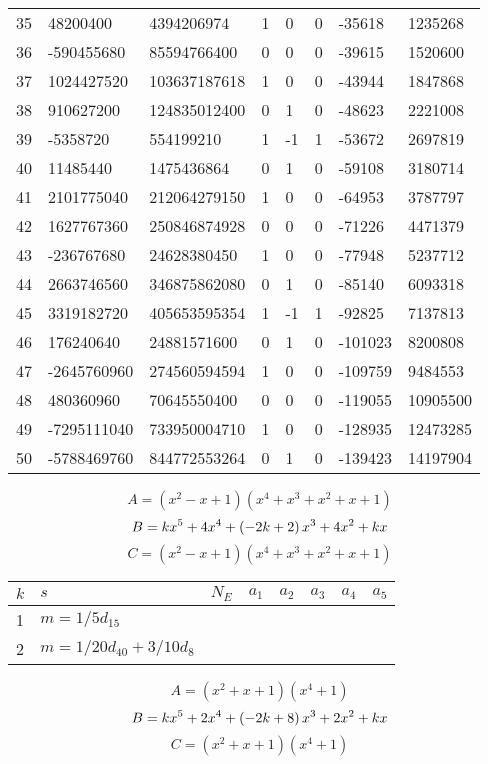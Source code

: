 \documentclass{amsart}
\begin{document}
\begin{longtable}{|l|l|l|lllll|}
35&48200400&4394206974&1&0&0&-35618&1235268\\
36&-590455680&85594766400&0&0&0&-39615&1520600\\
37&1024427520&103637187618&1&0&0&-43944&1847868\\
38&910627200&124835012400&0&1&0&-48623&2221008\\
39&-5358720&554199210&1&-1&1&-53672&2697819\\
40&11485440&1475436864&0&1&0&-59108&3180714\\
41&2101775040&212064279150&1&0&0&-64953&3787797\\
42&1627767360&250846874928&0&0&0&-71226&4471379\\
43&-236767680&24628380450&1&0&0&-77948&5237712\\
44&2663746560&346875862080&0&1&0&-85140&6093318\\
45&3319182720&405653595354&1&-1&1&-92825&7137813\\
46&176240640&24881571600&0&1&0&-101023&8200808\\
47&-2645760960&274560594594&1&0&0&-109759&9484553\\
48&480360960&70645550400&0&0&0&-119055&10905500\\
49&-7295111040&733950004710&1&0&0&-128935&12473285\\
50&-5788469760&844772553264&0&1&0&-139423&14197904\\
\hline
\end{longtable}
$$A=(x^2
 - x
 + 1)(x^4
 + x^3
 + x^2
 + x
 + 1)$$
$$B=k\*x^5
 + 4\*x^4
 + \left(-2\*k
 + 2\right) \*x^3
 + 4\*x^2
 + k\*x$$
$$C=(x^2
 - x
 + 1)(x^4
 + x^3
 + x^2
 + x
 + 1)$$
\begin{longtable}{|l|l|l|lllll|}
\hline
$k$ & $s$ & $N_E$ & $a_1$ & $a_2$ & $a_3$ & $a_4$ & $a_5$\\
\hline
1&$m=1/5d_{15}$&&\multicolumn{5}{c|}{}\\
2&$m=1/20d_{40}+3/10d_{8}$&&\multicolumn{5}{c|}{}\\
\hline
\end{longtable}
$$A=(x^2
 + x
 + 1)(x^4
 + 1)$$
$$B=k\*x^5
 + 2\*x^4
 + \left(-2\*k
 + 8\right) \*x^3
 + 2\*x^2
 + k\*x$$
$$C=(x^2
 + x
 + 1)(x^4
 + 1)$$
\end{document}
